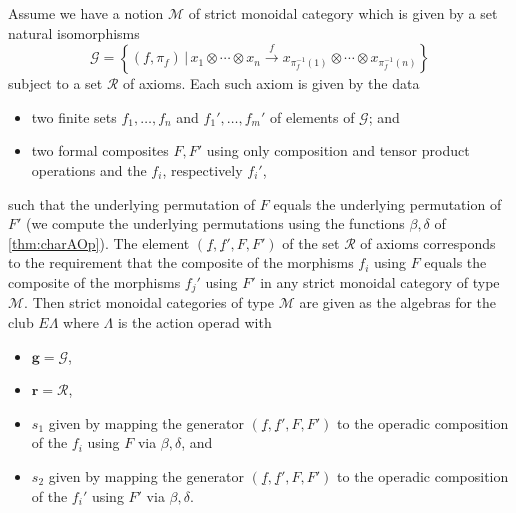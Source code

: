 \begin{cor}\label{cor:pres2}
Assume we have a notion $\mathcal{M}$ of strict monoidal category which is given by  a set natural isomorphisms
  \[
    \mathcal{G} = \left\{ (f, \pi_{f}) \, | \,  x_{1} \otimes \cdots \otimes x_{n} \stackrel{f}{\longrightarrow} x_{\pi_{f}^{-1}(1)} \otimes \cdots \otimes x_{\pi_{f}^{-1}(n)} \right\}
  \]
subject to a set $\mathcal{R}$ of axioms. Each such axiom is given by the data
\begin{itemize}
  \item two finite sets $f_{1}, \ldots, f_{n}$ and $f_{1}', \ldots, f_{m}'$ of elements of $\mathcal{G}$; and
  \item two formal composites $F,F'$ using only composition and tensor product operations and the $f_{i}$, respectively $f_{i}'$, 
\end{itemize}
such that the underlying permutation of $F$ equals the underlying permutation of $F'$ (we compute the underlying permutations using the functions $\beta, \delta$ of \cref{thm:charAOp}). The element $\left(\underline{f}, \underline{f}', F, F'\right)$ of the set $\mathcal{R}$ of axioms corresponds to the requirement that the composite of the morphisms $f_{i}$ using $F$ equals the composite of the morphisms $f_{j}'$ using $F'$ in any strict monoidal category of type $\mathcal{M}$. Then strict monoidal categories of type $\mathcal{M}$ are given as the algebras for the club $E\Lambda$ where $\Lambda$ is the action operad with
\begin{itemize}
  \item $\mathbf{g} = \mathcal{G}$,
  \item $\mathbf{r} = \mathcal{R}$,
  \item $s_{1}$ given by mapping the generator $\left(\underline{f}, \underline{f}', F, F'\right)$ to the operadic composition of the $f_{i}$ using $F$ via $\beta, \delta$, and
  \item $s_{2}$ given by mapping the generator $\left(\underline{f}, \underline{f}', F, F'\right)$ to the operadic composition of the $f_{i}'$ using $F'$ via $\beta, \delta$.
\end{itemize}
\end{cor}

